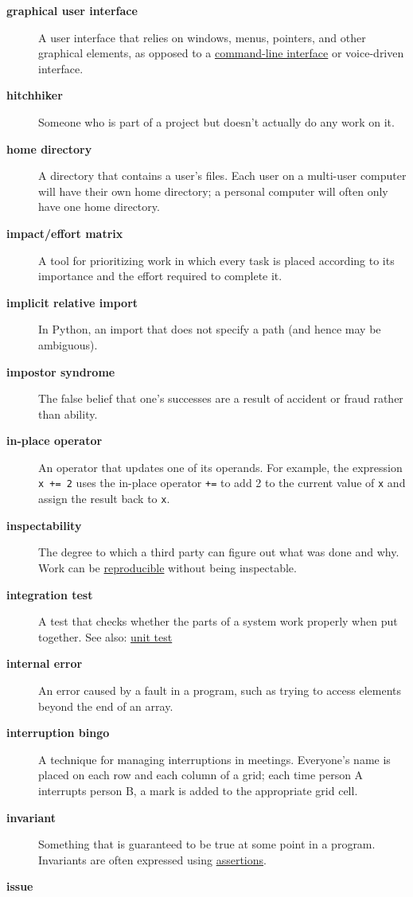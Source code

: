 \documentclass[
]{krantz}
\begin{document}
\begin{description}
\item[\textbf{graphical user interface}]
A user interface that relies on windows, menus, pointers, and other graphical elements, as opposed to a \protect\hyperlink{cli}{command-line interface} or voice-driven interface.
\item[\textbf{hitchhiker}]
Someone who is part of a project but doesn't actually do any work on it.
\item[\textbf{home directory}]
A directory that contains a user's files. Each user on a multi-user computer will have their own home directory; a personal computer will often only have one home directory.
\item[\textbf{impact/effort matrix}]
A tool for prioritizing work in which every task is placed according to its importance and the effort required to complete it.
\item[\textbf{implicit relative import}]
In Python, an import that does not specify a path (and hence may be ambiguous).
\item[\textbf{impostor syndrome}]
The false belief that one's successes are a result of accident or fraud rather than ability.
\item[\textbf{in-place operator}]
An operator that updates one of its operands. For example, the expression \texttt{x\ +=\ 2} uses the in-place operator \texttt{+=} to add 2 to the current value of \texttt{x} and assign the result back to \texttt{x}.
\item[\textbf{inspectability}]
The degree to which a third party can figure out what was done and why. Work can be \protect\hyperlink{reproducibility}{reproducible} without being inspectable.
\item[\textbf{integration test}]
A test that checks whether the parts of a system work properly when put together. See also: \protect\hyperlink{unit_test}{unit test}
\item[\textbf{internal error}]
An error caused by a fault in a program, such as trying to access elements beyond the end of an array.
\item[\textbf{interruption bingo}]
A technique for managing interruptions in meetings. Everyone's name is placed on each row and each column of a grid; each time person A interrupts person B, a mark is added to the appropriate grid cell.
\item[\textbf{invariant}]
Something that is guaranteed to be true at some point in a program. Invariants are often expressed using \protect\hyperlink{assertion}{assertions}.
\item[\textbf{issue}]

\end{description}
\end{document}
